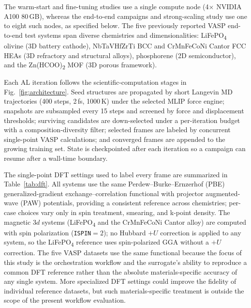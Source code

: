 \documentclass[11pt,a4paper]{article}
\def\ac#1{#1}%
\begin{document}
The warm-start and fine-tuning studies use a single compute node
(4$\times$ NVIDIA A100 80\,GB), whereas the end-to-end campaigns and
strong-scaling study use one to eight such nodes, as specified below. The five
previously reported VASP end-to-end test systems span diverse chemistries and dimensionalities:
LiFePO\textsubscript{4} olivine (3D battery cathode), NbTaVHfZrTi \ac{BCC} and
CrMnFeCoNi Cantor FCC \acsp{HEA} (3D refractory and structural alloys),
phosphorene (2D semiconductor), and the Zn(HCOO)\textsubscript{2} \ac{MOF} (3D
porous framework).

Each \ac{AL} iteration follows the scientific-computation stages in
Fig.~\ref{fig:architecture}. Seed structures are propagated by short Langevin
\ac{MD} trajectories (400 steps, 2\,fs, 1000\,K) under the selected \ac{MLIP}
force engine; snapshots are subsampled every 15 steps and screened by force and
displacement thresholds; surviving candidates are down-selected under a
per-iteration budget with a composition-diversity filter; selected frames are
labeled by concurrent single-point \ac{VASP} calculations; and converged frames
are appended to the growing training set. State is checkpointed after each
iteration so a campaign can resume after a wall-time boundary.

The single-point \ac{DFT} settings used to label every frame are summarized in
Table~\ref{tab:dft}. All systems use the same Perdew--Burke--Ernzerhof (PBE)
generalized-gradient exchange--correlation functional with projector
augmented-wave (PAW) potentials, providing a consistent reference across
chemistries; per-case choices vary only in spin treatment, smearing, and k-point
density. The magnetic $3d$ systems (LiFePO\textsubscript{4} and the CrMnFeCoNi
Cantor alloy) are computed with spin polarization (\texttt{ISPIN}$=2$); no
Hubbard $+U$ correction is applied to any system, so the
LiFePO\textsubscript{4} reference uses spin-polarized \ac{GGA} without a $+U$
correction. The five VASP datasets use the same functional because the
focus of this study is the orchestration workflow and the surrogate's ability
to reproduce a common \ac{DFT} reference rather than the absolute
materials-specific accuracy of any single system. More specialized \ac{DFT}
settings could improve the fidelity of individual reference datasets, but such
materials-specific treatment is outside the scope of the present workflow
evaluation.
\end{document}
